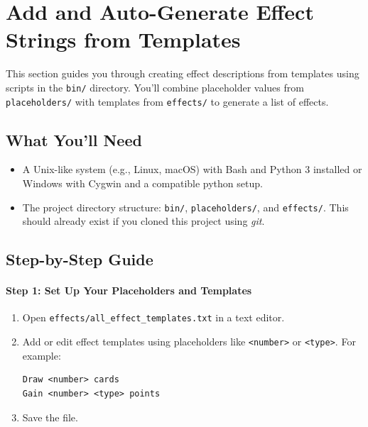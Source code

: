 \section{Add and Auto-Generate Effect Strings from Templates}

This section guides you through creating effect descriptions from templates using scripts in the \texttt{bin/} directory. You’ll combine placeholder values from \texttt{placeholders/} with templates from \texttt{effects/} to generate a list of effects.

\subsection{What You’ll Need}
\begin{itemize}
	\item A Unix-like system (e.g., Linux, macOS) with Bash and Python 3 installed or Windows with Cygwin and a compatible python setup.
	\item The project directory structure: \texttt{bin/}, \texttt{placeholders/}, and \texttt{effects/}. This should already exist if you cloned this project using \textit{git}.
\end{itemize}

\subsection{Step-by-Step Guide}

\paragraph{Step 1: Set Up Your Placeholders and Templates}
\begin{enumerate}
	\item Open \texttt{effects/all\_effect\_templates.txt} in a text editor.
	\item Add or edit effect templates using placeholders like \texttt{<number>} or \texttt{<type>}. For example:
\begin{lstlisting}
Draw <number> cards
Gain <number> <type> points
\end{lstlisting}
	\item Save the file.
\end{enumerate}

